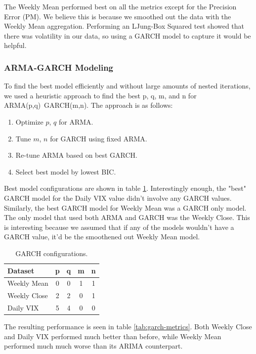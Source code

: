 \documentclass[twocolumn]{article}
\begin{document}
The Weekly Mean performed best on all the metrics except for the Precision Error (PM). We believe this is because we smoothed out the data with the Weekly Mean aggregation. Performing an LJung-Box Squared test showed that there was volatility in our data, so using a GARCH model to capture it would be helpful.

\subsubsection*{ARMA-GARCH Modeling}

To find the best model efficiently and without large amounts of nested iterations, we used a heuristic approach to find the best p, q, m, and n for ARMA(p,q)~GARCH(m,n). The approach is as follows:
\begin{enumerate}
    \item Optimize $p$, $q$ for ARMA.
    \item Tune $m$, $n$ for GARCH using fixed ARMA.
    \item Re-tune ARMA based on best GARCH.
    \item Select best model by lowest BIC.
\end{enumerate}

Best model configurations are shown in table \ref{tab:garch-values}. Interestingly enough, the "best" GARCH model for the Daily VIX value didn't involve any GARCH values. Similarly, the best GARCH model for Weekly Mean was a GARCH only model. The only model that used both ARMA and GARCH was the Weekly Close. This is interesting because we assumed that if any of the models wouldn't have a GARCH value, it'd be the smoothened out Weekly Mean model.

\begin{table}[h!]
\centering
\small
\begin{tabular}{|l|c|c|c|c|}
\hline
\textbf{Dataset} & \textbf{p} & \textbf{q} & \textbf{m} & \textbf{n} \\
\hline
Weekly Mean & 0 & 0 & 1 & 1 \\
Weekly Close & 2 & 2 & 0 & 1 \\
Daily VIX & 5 & 4 & 0 & 0 \\
\hline
\end{tabular}
\caption{GARCH configurations.}
\label{tab:garch-values}
\end{table}

The resulting performance is seen in table \ref{tab:garch-metrics}. Both Weekly Close and Daily VIX performed much better than before, while Weekly Mean performed much much worse than its ARIMA counterpart.
\end{document}
